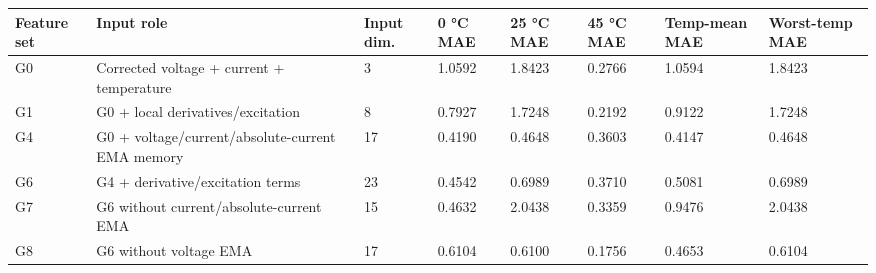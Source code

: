 \begin{tabular}{llllllll}
\hline
Feature set & Input role & Input dim. & 0 °C MAE & 25 °C MAE & 45 °C MAE & Temp-mean MAE & Worst-temp MAE \\
\hline
G0 & Corrected voltage + current + temperature & 3 & 1.0592 & 1.8423 & 0.2766 & 1.0594 & 1.8423 \\
G1 & G0 + local derivatives/excitation & 8 & 0.7927 & 1.7248 & 0.2192 & 0.9122 & 1.7248 \\
G4 & G0 + voltage/current/absolute-current EMA memory & 17 & 0.4190 & 0.4648 & 0.3603 & 0.4147 & 0.4648 \\
G6 & G4 + derivative/excitation terms & 23 & 0.4542 & 0.6989 & 0.3710 & 0.5081 & 0.6989 \\
G7 & G6 without current/absolute-current EMA & 15 & 0.4632 & 2.0438 & 0.3359 & 0.9476 & 2.0438 \\
G8 & G6 without voltage EMA & 17 & 0.6104 & 0.6100 & 0.1756 & 0.4653 & 0.6104 \\
\hline
\end{tabular}
